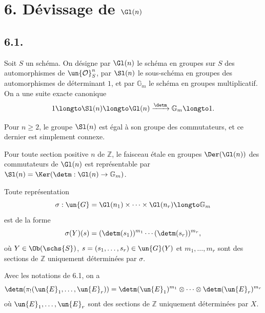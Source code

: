 \section*{6. D\'evissage de $\Gl(n)$}

\subsection*{6.1.}

Soit $S$ un sch\'ema. On d\'esigne par $\Gl(n)$ le sch\'ema en groupes sur $S$ des automorphismes de $\un{\mathcal{O}}_{S}^{n}$, par $\Sl(n)$ le sous-sch\'ema en groupes des automorphismes de d\'eterminant $1$, et par $\mathbb{G}_{m}$ le sch\'ema en groupes multiplicatif. On a une suite exacte canonique
\[
1 \longto \Sl(n) \longto \Gl(n) \xrightarrow{\detm} \mathbb{G}_{m} \longto 1.
\]

\begin{proposition}[6.2.1]
Pour $n \geqslant 2$, le groupe $\Sl(n)$ est \'egal \`a son groupe des commutateurs, et ce dernier est simplement connexe.
\end{proposition}

\begin{proposition}[6.2.2]
Pour toute section positive $n$ de $\mathbb{Z}$, le faisceau \'etale en groupes $\Der(\Gl(n))$ des commutateurs de $\Gl(n)$ est repr\'esentable par $\Sl(n) = \Ker(\detm : \Gl(n) \to \mathbb{G}_{m})$.
\end{proposition}

\begin{corollaire}[6.2.3]
Toute repr\'esentation
\begin{equation}\label{eq:6.2.4}
\sigma : \un{G} = \Gl(n_{1}) \times \dots \times \Gl(n_{r}) \longto \mathbb{G}_{m}
\end{equation}
est de la forme
\begin{equation}\label{eq:6.2.5}
\sigma(Y)(s) = (\detm(s_{1}))^{m_{1}} \dotsm (\detm(s_{r}))^{m_{r}},
\end{equation}
o\`u $Y \in \Ob(\schs{S})$, $s = (s_{1}, \dots, s_{r}) \in \un{G}(Y)$ et $m_{1}, \dots, m_{r}$ sont des sections de $\mathbb{Z}$ uniquement d\'etermin\'ees par $\sigma$.
\end{corollaire}

\begin{corollaire}[6.2.4]
Avec les notations de 6.1, on a
\begin{equation}\label{eq:6.2.6}
\detm(\pi_{!}(\un{E}_{1}, \dots, \un{E}_{r})) = \detm(\un{E}_{1})^{m_{1}} \otimes \dots \otimes \detm(\un{E}_{r})^{m_{r}}
\end{equation}
o\`u $\un{E}_{1}, \dots, \un{E}_{r}$ sont des sections de $\mathbb{Z}$ uniquement d\'etermin\'ees par $X$.
\end{corollaire}


